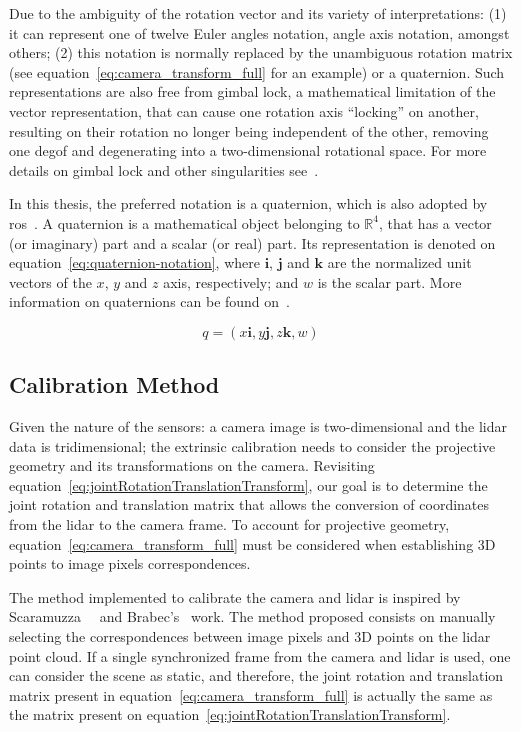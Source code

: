 Due to the ambiguity of the rotation vector and its variety of interpretations: (1) it can represent one of twelve Euler angles notation, angle axis notation, amongst others; (2) this notation is normally replaced by the unambiguous rotation matrix (see equation~\ref{eq:camera_transform_full} for an example) or a quaternion. Such representations are also free from gimbal lock, a mathematical limitation of the vector representation, that can cause one rotation axis ``locking'' on another, resulting on their rotation no longer being independent of the other, removing one \acl{degof} and degenerating into a two-dimensional rotational space. For more details on gimbal lock and other singularities see~\cite{mvg_book, Slabaugh, camera_models}.

In this thesis, the preferred notation is a quaternion, which is also adopted by \ac{ros}~\cite{Foote2014}. A quaternion is a mathematical object belonging to $\mathbb{R}^4$, that has a vector (or imaginary) part and a scalar (or real) part. Its representation is denoted on equation~\ref{eq:quaternion-notation}, where $\mathbf{i}$, $\mathbf{j}$ and $\mathbf{k}$ are the normalized unit vectors of the $x$, $y$ and $z$ axis, respectively; and $w$ is the scalar part. More information on quaternions can be found on~\cite{mvg_book}.

\begin{equation}
	\label{eq:quaternion-notation}
	q = (x\mathbf{i}, y\mathbf{j}, z\mathbf{k}, w)
\end{equation}

\subsection{Calibration Method}
\label{subsec:calibration:calibration-method}
Given the nature of the sensors: a camera image is two-dimensional and the \ac{lidar} data is tridimensional; the extrinsic calibration needs to consider the projective geometry and its transformations on the camera. Revisiting equation~\ref{eq:jointRotationTranslationTransform}, our goal is to determine the joint rotation and translation matrix that allows the conversion of coordinates from the \ac{lidar} to the camera frame. To account for projective geometry, equation~\ref{eq:camera_transform_full} must be considered when establishing 3D points to image pixels correspondences.

The method implemented to calibrate the camera and \ac{lidar} is inspired by Scaramuzza~\etal~\cite{Scaramuzza} and Brabec's~\cite{brabec2014} work. The method proposed consists on manually selecting the correspondences between image pixels and 3D points on the \ac{lidar} point cloud. If a single synchronized frame from the camera and \ac{lidar} is used, one can consider the scene as static, and therefore, the joint rotation and translation matrix present in equation~\eqref{eq:camera_transform_full} is actually the same as the matrix present on equation~\eqref{eq:jointRotationTranslationTransform}. 

